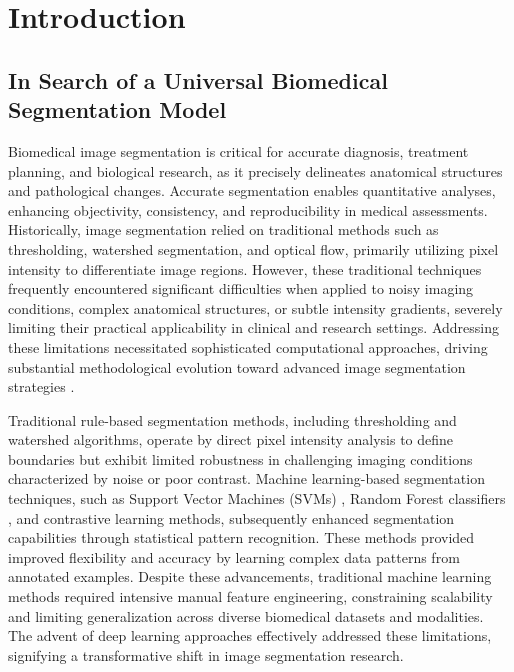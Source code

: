\documentclass[./dissertation.tex]{subfiles}
\begin{document}
\chapter{Introduction}


\section{In Search of a Universal Biomedical Segmentation Model}
Biomedical image segmentation is critical for accurate diagnosis, treatment planning, and biological research, as it precisely delineates anatomical structures and pathological changes. Accurate segmentation enables quantitative analyses, enhancing objectivity, consistency, and reproducibility in medical assessments. Historically, image segmentation relied on traditional methods such as thresholding, watershed segmentation, and optical flow, primarily utilizing pixel intensity to differentiate image regions. However, these traditional techniques frequently encountered significant difficulties when applied to noisy imaging conditions, complex anatomical structures, or subtle intensity gradients, severely limiting their practical applicability in clinical and research settings. Addressing these limitations necessitated sophisticated computational approaches, driving substantial methodological evolution toward advanced image segmentation strategies \cite{isensee2021nnu, hatamizadeh2022unetr}.


Traditional rule-based segmentation methods, including thresholding and watershed algorithms, operate by direct pixel intensity analysis to define boundaries but exhibit limited robustness in challenging imaging conditions characterized by noise or poor contrast. Machine learning-based segmentation techniques, such as Support Vector Machines (SVMs) \cite{cortes1995support}, Random Forest classifiers \cite{breiman2001random}, and contrastive learning methods, subsequently enhanced segmentation capabilities through statistical pattern recognition. These methods provided improved flexibility and accuracy by learning complex data patterns from annotated examples. Despite these advancements, traditional machine learning methods required intensive manual feature engineering, constraining scalability and limiting generalization across diverse biomedical datasets and modalities. The advent of deep learning approaches effectively addressed these limitations, signifying a transformative shift in image segmentation research.
\end{document}
